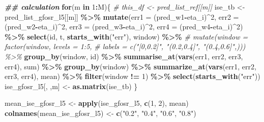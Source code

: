 \documentclass[
]{article}
\newenvironment{Shaded}{\begin{snugshade}}{\end{snugshade}}
\newcommand{\AttributeTok}[1]{\textcolor[rgb]{0.13,0.29,0.53}{#1}}
\newcommand{\CommentTok}[1]{\textcolor[rgb]{0.56,0.35,0.01}{\textit{#1}}}
\newcommand{\ControlFlowTok}[1]{\textcolor[rgb]{0.13,0.29,0.53}{\textbf{#1}}}
\newcommand{\DecValTok}[1]{\textcolor[rgb]{0.00,0.00,0.81}{#1}}
\newcommand{\DocumentationTok}[1]{\textcolor[rgb]{0.56,0.35,0.01}{\textbf{\textit{#1}}}}
\newcommand{\FunctionTok}[1]{\textcolor[rgb]{0.13,0.29,0.53}{\textbf{#1}}}
\newcommand{\NormalTok}[1]{#1}
\newcommand{\OtherTok}[1]{\textcolor[rgb]{0.56,0.35,0.01}{#1}}
\newcommand{\SpecialCharTok}[1]{\textcolor[rgb]{0.81,0.36,0.00}{\textbf{#1}}}
\newcommand{\StringTok}[1]{\textcolor[rgb]{0.31,0.60,0.02}{#1}}
\begin{document}
\begin{Shaded}
\begin{Highlighting}[]
\DocumentationTok{\#\# calculation}
\ControlFlowTok{for}\NormalTok{(m }\ControlFlowTok{in} \DecValTok{1}\SpecialCharTok{:}\NormalTok{M)\{}
  \CommentTok{\# this\_df \textless{}{-} pred\_list\_ref[[m]]}
\NormalTok{  ise\_tb }\OtherTok{\textless{}{-}}\NormalTok{ pred\_list\_gfosr\_l5[[m]] }\SpecialCharTok{\%\textgreater{}\%}
    \FunctionTok{mutate}\NormalTok{(}\AttributeTok{err1 =}\NormalTok{ (pred\_w1}\SpecialCharTok{{-}}\NormalTok{eta\_i)}\SpecialCharTok{\^{}}\DecValTok{2}\NormalTok{,}
           \AttributeTok{err2 =}\NormalTok{ (pred\_w2}\SpecialCharTok{{-}}\NormalTok{eta\_i)}\SpecialCharTok{\^{}}\DecValTok{2}\NormalTok{,}
           \AttributeTok{err3 =}\NormalTok{ (pred\_w3}\SpecialCharTok{{-}}\NormalTok{eta\_i)}\SpecialCharTok{\^{}}\DecValTok{2}\NormalTok{,}
           \AttributeTok{err4 =}\NormalTok{ (pred\_w4}\SpecialCharTok{{-}}\NormalTok{eta\_i)}\SpecialCharTok{\^{}}\DecValTok{2}\NormalTok{) }\SpecialCharTok{\%\textgreater{}\%}
    \FunctionTok{select}\NormalTok{(id, t, }\FunctionTok{starts\_with}\NormalTok{(}\StringTok{"err"}\NormalTok{), window) }\SpecialCharTok{\%\textgreater{}\%} 
    \CommentTok{\# mutate(window = factor(window, levels = 1:5, }
    \CommentTok{\#                        labels = c("[0,0.2]", "(0.2,0.4]", "(0.4,0.6]",))) \%\textgreater{}\% }
    \FunctionTok{group\_by}\NormalTok{(window, id) }\SpecialCharTok{\%\textgreater{}\%} 
    \FunctionTok{summarise\_at}\NormalTok{(}\FunctionTok{vars}\NormalTok{(err1, err2, err3, err4), sum) }\SpecialCharTok{\%\textgreater{}\%} 
    \FunctionTok{group\_by}\NormalTok{(window) }\SpecialCharTok{\%\textgreater{}\%} 
    \FunctionTok{summarize\_at}\NormalTok{(}\FunctionTok{vars}\NormalTok{(err1, err2, err3, err4), mean) }\SpecialCharTok{\%\textgreater{}\%}
    \FunctionTok{filter}\NormalTok{(window }\SpecialCharTok{!=} \DecValTok{1}\NormalTok{) }\SpecialCharTok{\%\textgreater{}\%} 
    \FunctionTok{select}\NormalTok{(}\FunctionTok{starts\_with}\NormalTok{(}\StringTok{"err"}\NormalTok{))}
\NormalTok{  ise\_gfosr\_l5[, ,m] }\OtherTok{\textless{}{-}} \FunctionTok{as.matrix}\NormalTok{(ise\_tb)}
\NormalTok{\}}

\NormalTok{mean\_ise\_gfosr\_l5 }\OtherTok{\textless{}{-}} \FunctionTok{apply}\NormalTok{(ise\_gfosr\_l5, }\FunctionTok{c}\NormalTok{(}\DecValTok{1}\NormalTok{, }\DecValTok{2}\NormalTok{), mean)}
\FunctionTok{colnames}\NormalTok{(mean\_ise\_gfosr\_l5) }\OtherTok{\textless{}{-}} \FunctionTok{c}\NormalTok{(}\StringTok{"0.2"}\NormalTok{, }\StringTok{"0.4"}\NormalTok{, }\StringTok{"0.6"}\NormalTok{, }\StringTok{"0.8"}\NormalTok{)}
\end{Highlighting}
\end{Shaded}
\end{document}
